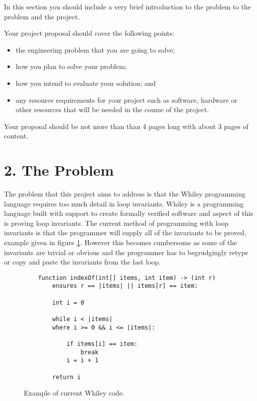 \documentclass[11pt, a4paper, twoside, openright]{report}
\begin{document}
In this section you should include a very brief introduction to the
problem to the problem and the project.

Your project proposal should cover the following points:

\begin{itemize}
    \item the engineering problem that you are going to solve;
    \item how you plan to solve your problem;
    \item how you intend to evaluate your solution; and
    \item any resource requirements for your project such as software,
        hardware or other resources that will be needed in the course of the
        project.
\end{itemize}


Your proposal should be not more than than 4 pages long with about 3 pages of content.

\section*{2. The Problem}


The problem that this project aims to address is that the Whiley programming language
requires too much detail in loop invariants.
Whiley is a programming language built with support to create formally verified
software and aspect of this is proving loop invariants.
The current method of programming with loop invariants is that the programmer will supply
all of the invariants to be proved, example given in figure \ref{fig:whiley-ex-1}.
However this becomes cumbersome as some of the invariants are trivial or obvious
and the programmer has to begrudgingly retype or copy and paste the invariants
from the last loop.


\begin{figure}[h]
    \begin{lstlisting}
    function indexOf(int[] items, int item) -> (int r)
        ensures r == |items| || items[r] == item:

        int i = 0

        while i < |items|
        where i >= 0 && i <= |items|:

            if items[i] == item:
                break
            i = i + 1

        return i
    \end{lstlisting}
    \caption{Example of current Whiley code.}
    \label{fig:whiley-ex-1}
\end{figure}
\end{document}
